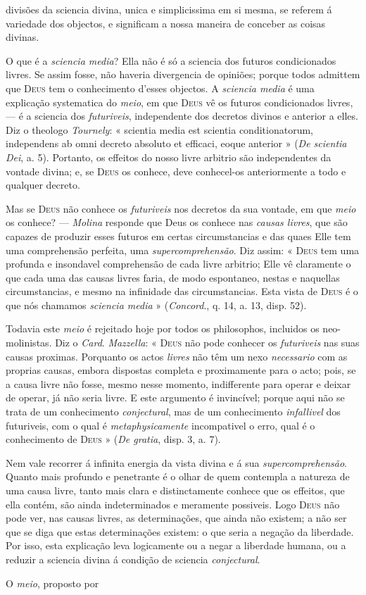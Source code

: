 divisões da sciencia divina, unica e simplicissima em si mesma, se referem á variedade dos objectos, e significam a nossa maneira de conceber as coisas divinas.\par O que é a \emph{sciencia media}? Ella não é só a sciencia dos futuros condicionados livres. Se assim fosse, não haveria divergencia de opiniões; porque todos admittem que \textsc{Deus} tem o conhecimento d'esses objectos. A \emph{sciencia media} é uma explicação systematica do \emph{meio}, em que \textsc{Deus} vê os futuros condicionados livres, --- é a sciencia dos \emph{futuriveis}, independente dos decretos divinos e anterior a elles. Diz o theologo \emph{Tournely}: « scientia media est scientia conditionatorum, independens ab omni decreto absoluto et efficaci, eoque anterior » (\emph{De scientia Dei}, a. 5). Portanto, os effeitos do nosso livre arbitrio são independentes da vontade divina; e, se \textsc{Deus} os conhece, deve conhecel-os anteriormente a todo e qualquer decreto.\par Mas se \textsc{Deus} não conhece os \emph{futuriveis} nos decretos da sua vontade, em que \emph{meio} os conhece? --- \emph{Molina} responde que Deus os conhece nas \emph{causas livres}, que são capazes de produzir esses futuros em certas circumstancias e das quaes Elle tem uma comprehensão perfeita, uma \emph{supercomprehensão}. Diz assim: « \textsc{Deus} tem uma profunda e insondavel comprehensão de cada livre arbitrio; Elle vê claramente o que cada uma das causas livres faria, de modo espontaneo, nestas e naquellas circumstancias, e mesmo na infinidade das circumstancias. Esta vista de \textsc{Deus} é o que nós chamamos \emph{sciencia media} » (\emph{Concord}., q. 14, a. 13, disp. 52).\par Todavia este \emph{meio} é rejeitado hoje por todos os philosophos, incluidos os neo-molinistas. Diz o \emph{Card}. \emph{Mazzella}: « \textsc{Deus} não pode conhecer os \emph{futuriveis} nas suas causas proximas. Porquanto os actos \emph{livres} não têm um nexo \emph{necessario} com as proprias causas, embora dispostas completa e proximamente para o acto; pois, se a causa livre não fosse, mesmo nesse momento, indifferente para operar e deixar de operar, já não seria livre. E este argumento é invincível; porque aqui não se trata de um conhecimento \emph{conjectural}, mas de um conhecimento \emph{infallivel} dos futuriveis, com o qual é \emph{metaphysicamente} incompativel o erro, qual é o conhecimento de \textsc{Deus} » (\emph{De gratia}, disp. 3, a. 7).\par Nem vale recorrer á infinita energia da vista divina e á sua \emph{supercomprehensão}. Quanto mais profundo e penetrante é o olhar de quem contempla a natureza de uma causa livre, tanto mais clara e distinctamente conhece que os effeitos, que ella contém, são ainda indeterminados e meramente possiveis. Logo \textsc{Deus} não pode ver, nas causas livres, as determinações, que ainda não existem; a não ser que se diga que estas determinações existem: o que seria a negação da liberdade. Por isso, esta explicação leva logicamente ou a negar a liberdade humana, ou a reduzir a sciencia divina á condição de sciencia \emph{conjectural}.\par O \emph{meio}, proposto por 